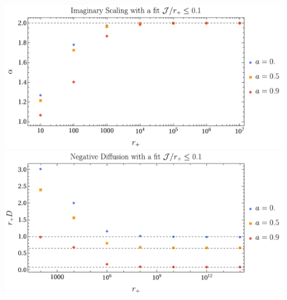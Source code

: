 \documentclass[aspectratio=169, xcolor=dvipsnames]{beamer}
\begin{document}
\begin{frame}
  \begin{columns}[c]
    \begin{column}{0.5\textwidth}
      \includegraphics[width=0.9\textwidth]{figs/vector_dispersive_mode_rp_vs_im_scaling_over_a_scaled_Jleq0_1.pdf}\\
      \includegraphics[width=0.9\textwidth]{figs/vector_dispersive_mode_rp_vs_diffusion_over_a_scaled_Jleq0_1.pdf}
    \end{column}


\end{columns}
\end{frame}
\end{document}
